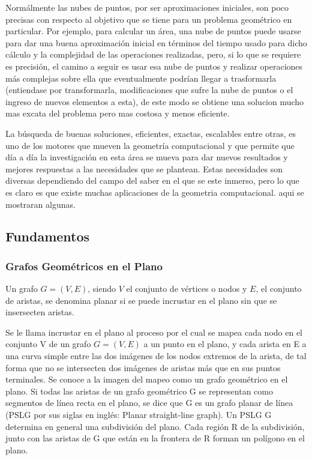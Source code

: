\documentclass[final, 12pt letterpaper]{article}
\begin{document}
Normálmente las nubes de puntos, por ser aproximaciones iniciales, son poco precisas con respecto al objetivo que se tiene para un problema geométrico en particular. Por ejemplo, para calcular un área, una nube de puntos puede usarse para dar una buena aproximación inicial en términos del tiempo usado para dicho cálculo y la complejidad de las operaciones realizadas, pero, si lo que se requiere es precisión, el camino a seguir es usar esa nube de puntos y realizar operaciones más complejas sobre ella que eventualmente podrían llegar a trasformarla (entiendase por transformarla, modificaciones que sufre la nube de puntos o el ingreso de nuevos elementos a esta), de este modo se obtiene una solucion mucho mas excata del problema pero mas costosa y menos eficiente.\medskip

La búsqueda de buenas soluciones, eficientes, exactas, escalables entre otras, es uno de los motores que mueven la geometría computacional y que permite que día a día la investigación en esta área se mueva para dar nuevos resultados y mejores respuestas a las necesidades que se plantean. Estas necesidades son diversas dependiendo del campo del saber en el que se este inmerso, pero lo que es claro es que existe muchas aplicaciones de la geometria computacional. aqui se mostraran algunas.

\subsection{Fundamentos}

\subsubsection{Grafos Geométricos en el Plano}

Un grafo $G = (V, E)$, siendo $V$ el conjunto de vértices o nodos y $E$, el conjunto de aristas, se denomina planar si se puede incrustar en el plano sin que se insersecten aristas.

Se le llama incrustar en el plano al proceso por el cual se mapea cada nodo en el conjunto V de un grafo $G = (V, E)$ a un punto en el plano, y cada arista en E a una curva simple entre las dos imágenes de los nodos extremos de la arista, de tal forma que no se intersecten dos imágenes de aristas más que en sus puntos terminales. Se conoce a la imagen del mapeo como un grafo geométrico en el plano.
Si todas las aristas de un grafo geométrico G se representan como segmentos de línea recta en el plano, se dice que G es un grafo planar de línea (PSLG por sus siglas en inglés: Planar straight-line graph). Un PSLG G determina en general una subdivisión del plano. Cada región R de la subdivisión, junto con las aristas de G que están en la frontera de R forman un polígono en el plano.
\end{document}
